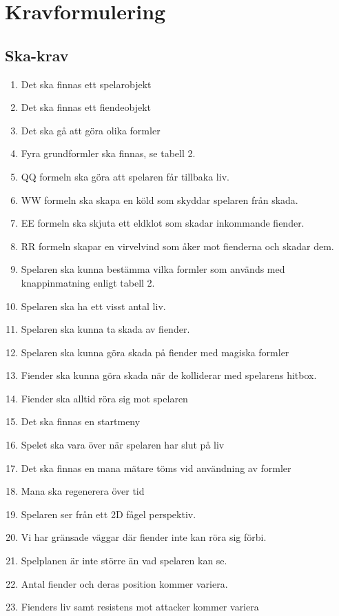 \documentclass[12pt]{TDP005mall}
\begin{document}
\section{Kravformulering}

\subsection{Ska-krav}
\begin{enumerate}
\item Det ska finnas ett spelarobjekt
\item Det ska finnas ett fiendeobjekt
\item Det ska gå att göra olika formler
\item Fyra grundformler ska finnas, se tabell 2.
\item QQ formeln ska göra att spelaren får tillbaka liv.
\item WW formeln ska skapa en köld som skyddar spelaren från skada.
\item EE formeln ska skjuta ett eldklot som skadar inkommande fiender.
\item RR formeln skapar en virvelvind som åker mot fienderna och skadar dem.
\item Spelaren ska kunna bestämma vilka formler som används med knappinmatning enligt tabell 2.
\item Spelaren ska ha ett visst antal liv.
\item Spelaren ska kunna ta skada av fiender.
\item Spelaren ska kunna göra skada på fiender med magiska formler
\item Fiender ska kunna göra skada när de kolliderar med spelarens hitbox.
\item Fiender ska alltid röra sig mot spelaren
\item Det ska finnas en startmeny
\item Spelet ska vara över när spelaren har slut på liv
\item Det ska finnas en mana mätare töms vid användning av formler
\item Mana ska regenerera över tid
\item Spelaren ser från ett 2D fågel perspektiv. 
\item Vi har gränsade väggar där fiender inte kan röra sig förbi.
\item Spelplanen är inte större än vad spelaren kan se.
\item Antal fiender och deras position kommer variera.
\item Fienders liv samt resistens mot attacker kommer variera


\end{enumerate}
\end{document}
